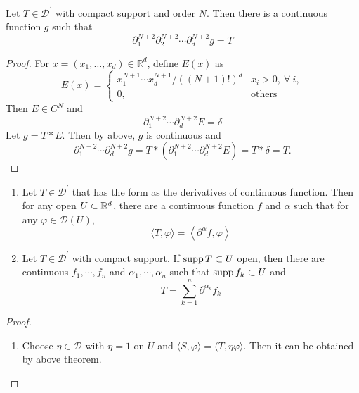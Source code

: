 \begin{enumerate}[label=\arabic*.]
	\begin{thm}
		Let $T \in \mathcal{D}^\prime$ with compact support and order $N$. Then there is a continuous function $g$ such that
		\begin{equation*}
			\partial_1^{N+2} \partial_2^{N+2} \cdots \partial_d^{N+2} g=T
		\end{equation*}
	\end{thm}
	\begin{proof}
		For $x=\left(x_1, \ldots, x_d\right) \in \mathbb{R}^d$, define $E(x)$ as
		\begin{equation*}
			E(x)= \begin{cases}x_1^{N+1} \cdots x_d^{N+1} /((N+1)!)^d & x_i > 0,~\forall~i, \\ 0, & \text {others}\end{cases}
		\end{equation*}
		Then $E \in C^N$ and
		\begin{equation*}
			\partial_1^{N+2} \cdots \partial_d^{N+2} E=\delta
		\end{equation*}
		Let $g = T * E$. Then by above, $g$ is continuous and
		\begin{equation*}
			\partial_1^{N+2} \cdots \partial_d^{N+2} g=T *\left(\partial_1^{N+2} \cdots \partial_d^{N+2} E\right)=T * \delta=T .
		\end{equation*}
	\end{proof}

	\begin{cor}
		\begin{enumerate}
			\item Let $T \in \mathcal{D}^\prime$ that has the form as the derivatives of continuous function. Then for any open $U \subset \mathbb{R}^d$, there are a continuous function $f$ and $\alpha$ such that for any $\varphi \in \mathcal{D}(U)$,
			\begin{equation*}
				\langle T, \varphi\rangle=\left\langle\partial^\alpha f, \varphi\right\rangle
			\end{equation*}
			\item Let $T \in \mathcal{D}^\prime$ with compact support. If $\operatorname{supp} T \subset U$ open, then there are continuous $f_1,\cdots,f_n$ and $\alpha_1,\cdots,\alpha_n$ such that $\operatorname{supp} f_k \subset U$ and
			\begin{equation*}
				T=\sum_{k=1}^n \partial^{\alpha_k} f_k
			\end{equation*}
		\end{enumerate}
	\end{cor}
	\begin{proof}
		\begin{enumerate}
			\item Choose $\eta \in \mathcal{D}$ with $\eta = 1$ on $U$ and $\langle S, \varphi\rangle=\langle T, \eta \varphi\rangle$. Then it can be obtained by above theorem.


\end{enumerate}
\end{proof}
\end{enumerate}
